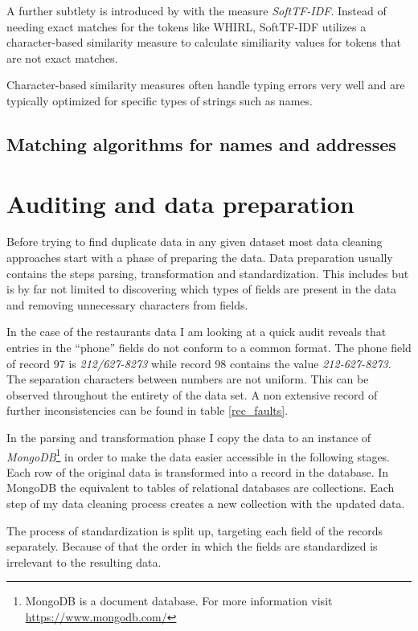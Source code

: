 \documentclass[conference]{IEEEtran}
\begin{document}
A further subtlety is introduced by \cite{Bilenko.2003} with the measure \emph{SoftTF-IDF}. Instead of needing exact matches for the tokens like WHIRL, SoftTF-IDF utilizes a character-based similarity measure to calculate similiarity values for tokens that are not exact matches.

Character-based similarity measures often handle typing errors very well and are typically optimized for specific types of strings such as names. 
\subsection{Matching algorithms for names and addresses}

\section{Auditing and data preparation}\label{prep}
Before trying to find duplicate data in any given dataset most data cleaning approaches start with a phase of preparing the data. Data preparation usually contains the steps parsing, transformation and standardization. This includes but is by far not limited to discovering which types of fields are present in the data and removing unnecessary characters from fields. 

In the case of the restaurants data I am looking at a quick audit reveals that entries in the \enquote{phone} fields do not conform to a common format. The phone field of record 97 is \emph{212/627-8273} while record 98 contains the value \emph{212-627-8273}. The separation characters between numbers are not uniform. This can be observed throughout the entirety of the data set. A non extensive record of further inconsistencies can be found in table \ref{rec_faults}. 

In the parsing and transformation phase I copy the data to an instance of \emph{MongoDB}\footnote{MongoDB is a document database. For more information visit \url{https://www.mongodb.com/}} in order to make the data easier accessible in the following stages. Each row of the original data is transformed into a record in the database. In MongoDB the equivalent to tables of relational databases are collections. Each step of my data cleaning process creates a new collection with the updated data.

The process of standardization is split up, targeting each field of the records separately. Because of that the order in which the fields are standardized is irrelevant to the resulting data.
\end{document}
